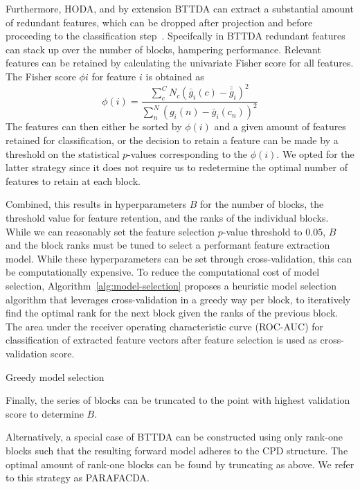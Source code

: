 Furthermore, HODA, and by extension BTTDA can extract a substantial amount
of redundant features, which can be dropped after projection and before proceeding to the classification
step~\cite{Phan2010}.
Specifcally in BTTDA redundant features can stack up over the number of
blocks, hampering performance.
Relevant features can be retained by calculating the
univariate Fisher score for all features.
The Fisher score $\phi{i}$ for feature $i$ is obtained as
\begin{equation}
	\phi(i) = \frac
	{\sum_c^C N_c \left(\bar{g}_i(c)-\bar{\bar{g}}_i\right)^2}
	{\sum_n^N \left(g_i(n)-\bar{g}_i(c_n)\right)^2}
\end{equation}
The features can then either be sorted by $\phi(i)$ and a given amount of
features retained for classification, or the decision to retain a feature can
be made by a threshold on the statistical $p$-values corresponding to the
$\phi(i)$.
We opted for the latter strategy since it does not require us to redetermine the
optimal number of features to retain at each block.

Combined, this results in hyperparameters $B$ for the number of blocks, the
threshold value for feature retention, and the ranks of the individual blocks.
While we can reasonably set the feature selection $p$-value threshold to $0.05$,
$B$ and the block ranks must be tuned to select a performant feature extraction
model.
While these hyperparameters can be set through cross-validation, this can be
computationally expensive.
To reduce the computational cost of model selection,
Algorithm~\ref{alg:model-selection} proposes a heuristic model selection
algorithm that leverages cross-validation in a greedy way per block, to
iteratively find the optimal rank for the next block given the ranks of the
previous block.
The area under the receiver operating characteristic curve (ROC-AUC) for
classification of extracted feature vectors after feature selection is used as
cross-validation score.
\begin{algorithm}
	\caption{Greedy model selection}
	\label{alg:model-selection}
	
\end{algorithm}
Finally, the series of blocks can be truncated to the point with
highest validation score to determine $B$.

Alternatively, a special case of BTTDA can be constructed using only rank-one
blocks such that the resulting forward model adheres to the CPD structure.
The optimal amount of rank-one blocks can be found by truncating as above.
We refer to this strategy as PARAFACDA.


